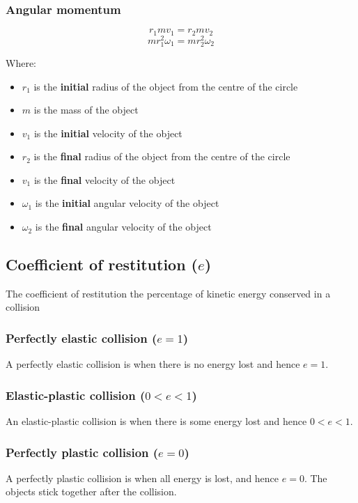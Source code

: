 \documentclass[11pt]{article}
\begin{document}
 \newpage

\subsubsection{Angular momentum}
\label{sec:org8d9ee9d}
\[r_1 mv_1 = r_2 m v_2\]
\[m r_1^2 \omega_1 = m r_2^2 \omega_2\]

Where:
\begin{itemize}
\item \(r_1\) is the \textbf{initial} radius of the object from the centre of the circle
\item \(m\) is the mass of the object
\item \(v_1\) is the \textbf{initial} velocity of the object
\item \(r_2\) is the \textbf{final} radius of the object from the centre of the circle
\item \(v_1\) is the \textbf{final} velocity of the object
\item \(\omega_1\) is the \textbf{initial} angular velocity of the object
\item \(\omega_2\) is the \textbf{final} angular velocity of the object
\end{itemize}

\subsection{Coefficient of restitution (\(e\))}
\label{sec:org4d99b49}
The coefficient of restitution the percentage of kinetic energy conserved in a collision

\subsubsection{Perfectly elastic collision (\(e = 1\))}
\label{sec:org605a412}
A perfectly elastic collision is when there is no energy lost and hence \(e = 1\).

\subsubsection{Elastic-plastic collision (\(0 < e < 1\))}
\label{sec:orged19985}
An elastic-plastic collision is when there is some energy lost and hence \(0 < e < 1\).

\subsubsection{Perfectly plastic collision (\(e = 0\))}
\label{sec:org62b34ab}
A perfectly plastic collision is when all energy is lost, and hence \(e = 0\). The objects stick together after the collision.
\end{document}
